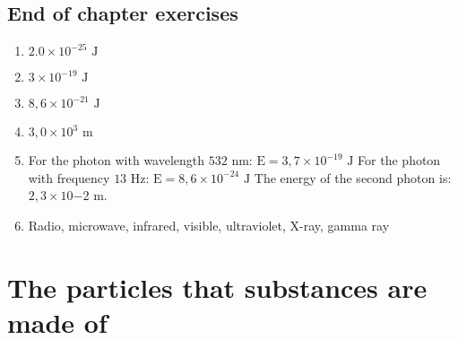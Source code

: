 \subsection{End of chapter exercises} 
\begin{multicols}{2}
\begin{enumerate}[itemsep=20pt, label=\textbf{\arabic*}.]
\item $2.0 \times 10^{-25} \text{ J}$
\item $3 \times 10^{-19} \text{ J}$
\item $8,6 \times 10^{-21} \text{ J}$
\item $3,0 \times 10^{3} \text{ m}$
\item For the photon with wavelength $532 \text{ nm}$: $\text{E}=3,7 \times 10^{-19} \text{ J}$ \newline
For the photon with frequency $13 \text{ Hz}$: $\text{E}=8,6 \times 10^{-24} \text{ J}$ \newline
The energy of the second photon is: $2,3 \times 10{-2} \text{ m}$.
\item Radio, microwave, infrared, visible, ultraviolet, X-ray, gamma ray
\end{enumerate}
\end{multicols}

\section{The particles that substances are made of}

